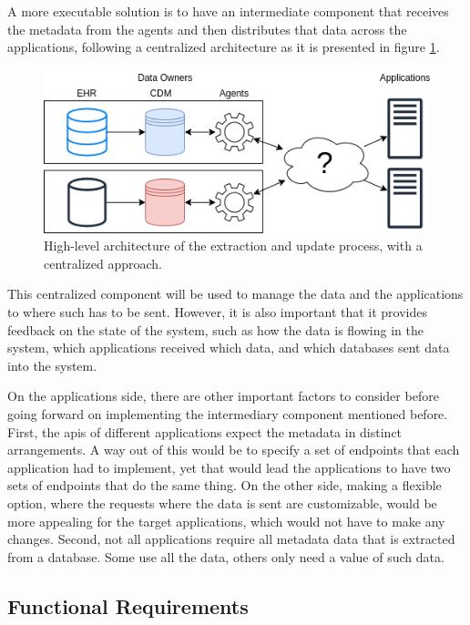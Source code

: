 A more executable solution is to have an intermediate component that receives the metadata from the agents and then distributes that data across the applications, following a centralized architecture as it is presented in figure \ref{fig:new-overall-arch}.

\begin{figure}[h]
    \center
    \includegraphics[width=.6\textwidth]{new-overall-arch}
    \caption{High-level architecture of the extraction and update process, with a centralized approach.}
    \label{fig:new-overall-arch}
\end{figure}

This centralized component will be used to manage the data and the applications to where such has to be sent.
However, it is also important that it provides feedback on the state of the system, such as how the data is flowing in the system, which applications received which data, and which databases sent data into the system.


On the applications side, there are other important factors to consider before going forward on implementing the intermediary component mentioned before.
First, the \gls{api}s of different applications expect the metadata in distinct arrangements.
A way out of this would be to specify a set of endpoints that each application had to implement, yet that would lead the applications to have two sets of endpoints that do the same thing.
On the other side, making a flexible option, where the requests where the data is sent are customizable, would be more appealing for the target applications, which would not have to make any changes.
Second, not all applications require all metadata data that is extracted from a database.
Some use all the data, others only need a value of such data.

\subsection{Functional Requirements}

